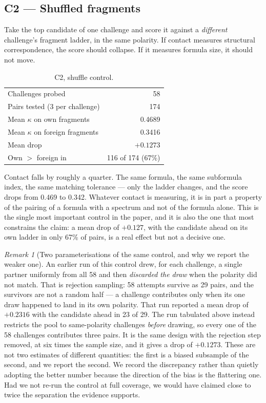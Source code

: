 \documentclass[11pt,twocolumn,a4paper]{article}
\theoremstyle{definition}
\theoremstyle{remark}
\newtheorem{remark}[theorem]{Remark}
\newcommand{\con}{\kappa}
\begin{document}
\subsection{C2 --- Shuffled fragments}

Take the top candidate of one challenge and score it against a \emph{different}
challenge's fragment ladder, in the same polarity. If contact measures structural
correspondence, the score should collapse. If it measures formula size, it should
not move.

\begin{table}[!htbp]
\centering
\caption{C2, shuffle control.}
\label{tab:c2}
\begin{tabular}{lr}
\toprule
Challenges probed                 & 58 \\
Pairs tested (3 per challenge)    & 174 \\
Mean $\con$ on own fragments      & 0.4689 \\
Mean $\con$ on foreign fragments  & 0.3416 \\
Mean drop                         & $+0.1273$ \\
Own $>$ foreign in                & 116 of 174 (67\%) \\
\bottomrule
\end{tabular}
\end{table}

Contact falls by roughly a quarter. The same formula, the same subformula index,
the same matching tolerance --- only the ladder changes, and the score drops from
0.469 to 0.342. Whatever contact is measuring, it is in part a property of the
pairing of a formula with a spectrum and not of the formula alone. This is the
single most important control in the paper, and it is also the one that most
constrains the claim: a mean drop of $+0.127$, with the candidate ahead on its own
ladder in only 67\% of pairs, is a real effect but not a decisive one.

\begin{remark}[Two parameterisations of the same control, and why we report the
weaker one]
\label{rem:c2-parameterisation}
An earlier run of this control drew, for each challenge, a single partner
uniformly from all 58 and then \emph{discarded the draw} when the polarity did not
match. That is rejection sampling: 58 attempts survive as 29 pairs, and the
survivors are not a random half --- a challenge contributes only when its one draw
happened to land in its own polarity. That run reported a mean drop of $+0.2316$
with the candidate ahead in 23 of 29. The run tabulated above instead restricts the
pool to same-polarity challenges \emph{before} drawing, so every one of the 58
challenges contributes three pairs. It is the same design with the rejection step
removed, at six times the sample size, and it gives a drop of $+0.1273$. These are
not two estimates of different quantities: the first is a biased subsample of the
second, and we report the second. We record the discrepancy rather than quietly
adopting the better number because the direction of the bias is the flattering one.
Had we not re-run the control at full coverage, we would have claimed close to
twice the separation the evidence supports.
\end{remark}
\end{document}
